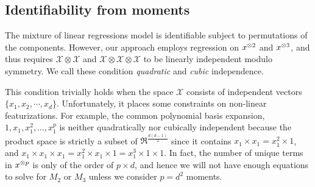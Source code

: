 

\subsection{Identifiability from moments}

The mixture of linear regressions model is identifiable subject to
permutations of the components\citationneeded. However, our approach
employs regression on $x^{\otimes 2}$ and $x^{\otimes 3}$, and thus requires
$\mathcal{X} \otimes \mathcal{X}$ and $\mathcal{X} \otimes \mathcal{X}
\otimes \mathcal{X}$ to be linearly independent modulo symmetry. We call
these condition {\em quadratic} and {\em cubic} independence.

This condition trivially holds when the space $\mathcal{X}$ consists of
independent vectors $\{ x_1, x_2, \cdots, x_d \}$. Unfortunately, it
places some constraints on non-linear featurizations. For example, the
common polynomial basis expansion, $1, x_1, x_1^2, \dots, x_1^p$ is
neither quadratically nor cubically independent because the product
space is strictly a subset of $\Re^{\frac{d (d-1)}{2}}$ since it
contains $x_1 \times x_1 = x_1^2 \times 1$, and $x_1 \times x_1 \times
x_1 = x_1^2 \times x_1 \times 1 = x_1^3 \times 1 \times 1$. In fact, the
number of unique terms in $x^{\otimes p}$ is only of the order of $p \times
d$, and hence we will not have enough equations to solve for $M_2$ or
$M_3$ unless we consider $p = d^2$ moments.




